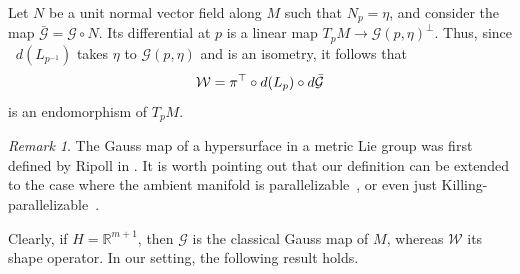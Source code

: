 \documentclass[a4paper,12pt,oneside]{amsart}
\newcommand{\diff}{\mathop{}\!d}
\theoremstyle{plain}
\theoremstyle{remark}
\newtheorem{remark}[theorem]{Remark}
\theoremstyle{definition}
\begin{document}
Let $N$ be a unit normal vector field along $M$ such that $N_{p} = \eta$, and consider the map $\bar{\mathcal{G}} = \mathcal{G} \circ N$. Its differential at $p$ is a linear map $T_{p}M \to \mathcal{G}(p,\eta)^{\perp}$. Thus, since $\diff(L_{p^{-1}})$ takes $\eta$ to $\mathcal{G}(p,\eta)$ and is an isometry, it follows that
\begin{equation*}
\mathcal{W} = \pi^{\top} \circ \diff\mleft(L_{p}\mright) \circ \diff\bar{\mathcal{G}}
\end{equation*}
is an endomorphism of $T_{p}M$.

\begin{remark}
The Gauss map of a hypersurface in a metric Lie group was first defined by Ripoll in \cite{ripoll1991}. It is worth pointing out that our definition can be extended to the case where the ambient manifold is parallelizable~\cite{ripoll1993}, or even just Killing-parallelizable~\cite{fornari2004}.
\end{remark}

Clearly, if $H=\mathbb{R}^{m+1}$, then $\mathcal{G}$ is the classical Gauss map of $M$, whereas $\mathcal{W}$ its shape operator. In our setting, the following result holds.
\end{document}
